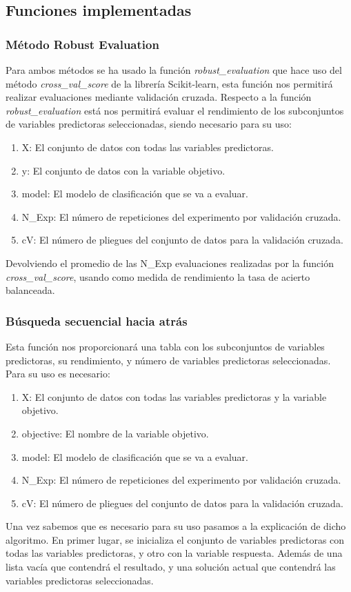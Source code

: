 \documentclass[conference,a4paper]{IEEEtran}
\begin{document}
\subsection{Funciones implementadas}

  \subsubsection*{Método Robust Evaluation}

  Para ambos métodos se ha usado la función \emph{robust\_evaluation} que hace uso del método
  \emph{cross\_val\_score} de la librería Scikit-learn, esta función nos permitirá realizar 
  evaluaciones mediante validación cruzada.
  Respecto a la función \emph{robust\_evaluation} está nos permitirá evaluar el rendimiento de los subconjuntos
  de variables predictoras seleccionadas, siendo necesario para su uso:
  \begin{enumerate}
    \item X: El conjunto de datos con todas las variables predictoras.
    \item y: El conjunto de datos con la variable objetivo.
    \item model: El modelo de clasificación que se va a evaluar.
    \item N\_Exp: El número de repeticiones del experimento por validación cruzada.
    \item cV: El número de pliegues del conjunto de datos para la validación cruzada.
  \end{enumerate}
  Devolviendo el promedio de las N\_Exp evaluaciones realizadas por la función \emph{cross\_val\_score}, usando como
  medida de rendimiento la tasa de acierto balanceada.

  \subsubsection*{Búsqueda secuencial hacia atrás} 
  Esta función nos proporcionará una tabla con los subconjuntos de variables predictoras, su rendimiento, y 
  número de variables predictoras seleccionadas.
  Para su uso es necesario:
  \begin{enumerate}
    \item X: El conjunto de datos con todas las variables predictoras y la variable objetivo.
    \item objective: El nombre de la variable objetivo.
    \item model: El modelo de clasificación que se va a evaluar.
    \item N\_Exp: El número de repeticiones del experimento por validación cruzada.
    \item cV: El número de pliegues del conjunto de datos para la validación cruzada.
  \end{enumerate}
  Una vez sabemos que es necesario para su uso pasamos a la explicación de dicho algoritmo.
  En primer lugar, se inicializa el conjunto de variables predictoras con todas las variables predictoras,
  y otro con la variable respuesta. Además de una lista vacía que contendrá el resultado, y una solución
  actual que contendrá las variables predictoras seleccionadas.
\end{document}
